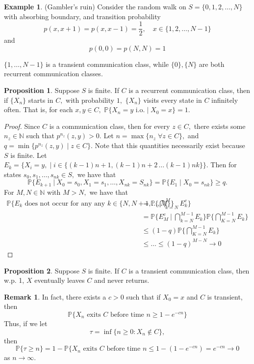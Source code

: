\documentclass[10pt, oneside]{article}
\newcommand{\bbP}{\mathbb{P}}
\newcommand{\bbN}{\mathbb{N}}
\theoremstyle{definition}
\newtheorem{exmp}{Example}[section]
\newtheorem{prop}{Proposition}
\newtheorem{rem}{Remark}
\begin{document}
\begin{exmp} (Gambler's ruin)
    Consider the random walk on $S = \{0,1,2, \dots, N\}$ with absorbing boundary, and transition probability
    \[p(x,x+1) = p(x, x-1) = \frac{1}{2}, \quad x\in \{1,2,\dots, N-1\}\] and 
    \[p(0,0) = p(N,N) = 1\]

    $\{1,\dots, N-1\}$ is a transient communication class, while $\{0\}, \{N\}$ are both recurrent communication classes.
\end{exmp}

\begin{prop}
    Suppose $S$ is finite. If $C$ is a recurrent communication class, then if $\{X_n\}$ starts in $C,$ with probability $1,$ $\{X_n\}$ visits every state in $C$ infinitely often. That is, for each $x,y \in C,$ $\bbP\{X_n = y \text{ i.o.} \; | \; X_0 = x\} = 1.$
\end{prop}
\begin{proof}
    Since $C$ is a communication class, then for every $z \in C,$ there exists some $n_z \in \bbN$ such that $p^{n_z}(z,y) >0.$ Let $n = \max\{n_z\; \forall z \in C\},$ and $q = \min\{p^{n_z}(z,y)\; | \; z\in C\}.$ Note that this quantities necessarily exist because $S$ is finite. Let $E_k = \{X_i = y, \; | \; i \in \{(k-1)n + 1, (k-1)n + 2\, \dots (k-1)nk\}\}.$ Then for states $s_0, s_1, \dots, s_{nk} \in S,$ we have that 
    \[\bbP\{E_{k+1} \: | \: X_0 = s_0, X_1 = s_1, \dots, X_{nk} = S_{nk}\} = \bbP\{E_1 \; | \; X_0 = s_{nk}\} \geq q.\] For $M, N \in \bbN$ with $M > N,$ we have that 
    \begin{align*}
      \bbP\{E_k \text{ does not occur for any any } k \in \{N, N + 1, \dots, M\}\} &= \bbP\{\bigcap_{k=N}^M E_k^c\}  \\
      &= \bbP\{E_M^c \:  | \: \bigcap_{k = N}^{M-1}E_k\}\bbP\{\bigcap_{K=N}^{M-1}E_k\}\\
      &\leq (1-q)\bbP\{\bigcap_{K=N}^{M-1}E_k\} \\
      &\leq\dots\leq (1-q)^{M-N} \to 0
    \end{align*}
\end{proof}
\begin{prop}
    Suppose $S$ is finite. If $C$ is a transient communication class, then w.p. 1, $X$ eventually leaves $C$ and never returns.
\end{prop}

\begin{rem}
    In fact, there exists a $c>0$ such that if $X_0 = x$ and $C$ is transient, then 
    \[\bbP\{X_n \text{ exits $C$ before time $n$} \geq 1- e^{-cn}\}\] Thus, if we let 
    \[\tau = \inf\{n \geq 0 : X_n \notin C\},\] then 
    \[\bbP\{\tau \geq n\} = 1- \bbP\{X_n \text{ exits $C$ before time $n$} \leq 1 - (1-e^{-cn}) = e^{-cn}\to 0\] as $n\to \infty.$ 
\end{rem}
\end{document}

